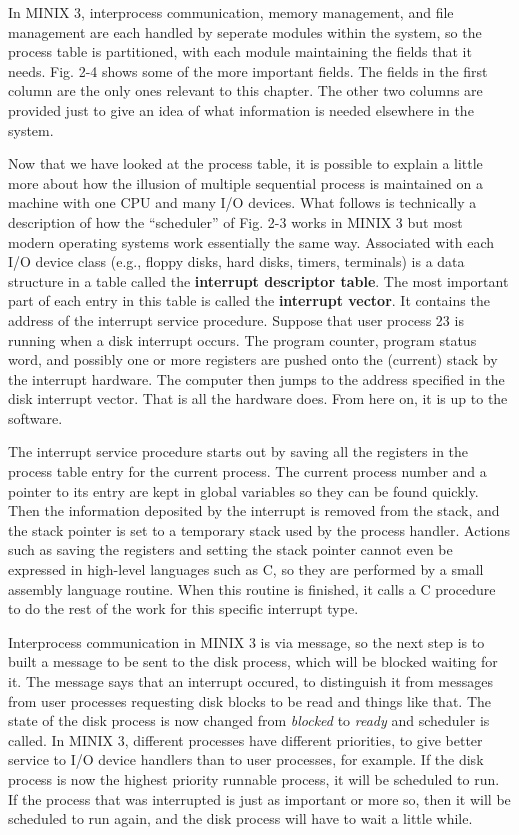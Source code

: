 \documentclass{book}
\newcommand {\kw}  [1] {\textbf{#1}}
\newcommand {\sys} [1] {\textsl{#1}}
\begin{document}
In MINIX 3, interprocess communication, memory management, and file management are each handled by seperate modules within the system,
so the process table is partitioned, with each module maintaining the fields that it needs.
Fig. 2-4 shows some of the more important fields.
The fields in the first column are the only ones relevant to this chapter.
The other two columns are provided just to give an idea of what information is needed elsewhere in the system.

Now that we have looked at the process table,
it is possible to explain a little more about how the illusion of multiple sequential process is maintained 
on a machine with one CPU and many I/O devices.
What follows is technically a description of how the ``scheduler'' of Fig. 2-3 works in MINIX 3 
but most modern operating systems work essentially the same way.
Associated with each I/O device class (e.g., floppy disks, hard disks, timers, terminals) is a data structure in a table 
called the \kw{interrupt descriptor table}.
The most important part of each entry in this table is called the \kw{interrupt vector}.
It contains the address of the interrupt service procedure.
Suppose that user process 23 is running when a disk interrupt occurs.
The program counter, program status word, and possibly one or more registers are pushed onto the (current) stack by the interrupt hardware.
The computer then jumps to the address specified in the disk interrupt vector.
That is all the hardware does.
From here on, it is up to the software.

The interrupt service procedure starts out by saving all the registers in the process table entry for the current process.
The current process number and a pointer to its entry are kept in global variables so they can be found quickly.
Then the information deposited by the interrupt is removed from the stack, 
and the stack pointer is set to a temporary stack used by the process handler. 
Actions such as saving the registers and setting the stack pointer cannot even be expressed in high-level languages such as C,
so they are performed by a small assembly language routine.
When this routine is finished, it calls a C procedure to do the rest of the work for this specific interrupt type.

Interprocess communication in MINIX 3 is via message,
so the next step is to built a message to be sent to the disk process,
which will be blocked waiting for it.
The message says that an interrupt occured,
to distinguish it from messages from user processes requesting disk blocks to be read and things like that.
The state of the disk process is now changed from \sys{blocked} to \sys{ready} and scheduler is called.
In MINIX 3, different processes have different priorities, 
to give better service to I/O device handlers than to user processes, for example.
If the disk process is now the highest priority runnable process, it will be scheduled to run.
If the process that was interrupted is just as important or more so, 
then it will be scheduled to run again, and the disk process will have to wait a little while.
\end{document}
